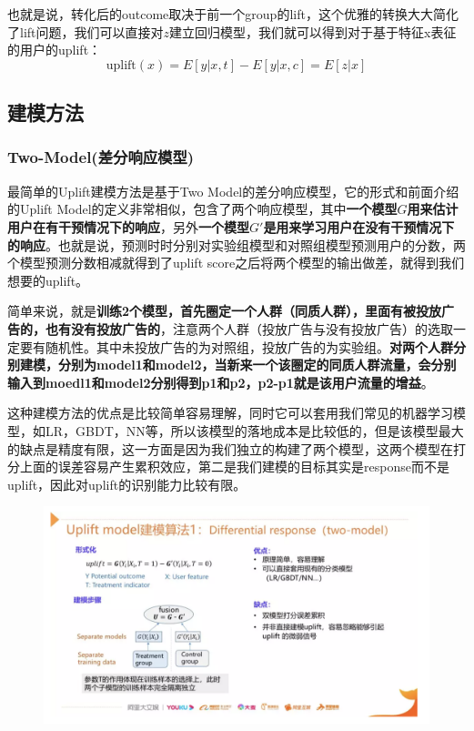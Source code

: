 \documentclass[12pt]{article}
\begin{document}
也就是说，转化后的outcome取决于前一个group的lift，这个优雅的转换大大简化了lift问题，我们可以直接对$z$建立回归模型，我们就可以得到对于基于特征x表征的用户的uplift：
$$
\text{uplift}(x) = E[y|x,t] - E[y|x,c] = E[z|x]
$$


\subsection{建模方法}
\subsubsection{Two-Model(差分响应模型)}
最简单的Uplift建模方法是基于Two Model的差分响应模型，它的形式和前面介绍的Uplift Model的定义非常相似，包含了两个响应模型，其中\textbf{一个模型$G$用来估计用户在有干预情况下的响应}，另外\textbf{一个模型$G'$是用来学习用户在没有干预情况下的响应}。也就是说，预测时时分别对实验组模型和对照组模型预测用户的分数，两个模型预测分数相减就得到了uplift score之后将两个模型的输出做差，就得到我们想要的uplift。

简单来说，就是\textbf{训练2个模型，首先圈定一个人群（同质人群），里面有被投放广告的，也有没有投放广告的}，注意两个人群（投放广告与没有投放广告）的选取一定要有随机性。其中未投放广告的为对照组，投放广告的为实验组。\textbf{对两个人群分别建模，分别为model1和model2，当新来一个该圈定的同质人群流量，会分别输入到moedl1和model2分别得到p1和p2，p2-p1就是该用户流量的增益}\cite{Understand_Uplift_Model_In_Ads}。

这种建模方法的优点是比较简单容易理解，同时它可以套用我们常见的机器学习模型，如LR，GBDT，NN等，所以该模型的落地成本是比较低的，但是该模型最大的缺点是精度有限，这一方面是因为我们独立的构建了两个模型，这两个模型在打分上面的误差容易产生累积效应，第二是我们建模的目标其实是response而不是uplift，因此对uplift的识别能力比较有限。

\begin{figure}[H]
    \centering
    \includegraphics[width=1\textwidth]{fig/CasualInference-Uplift-Model-Two-Model.png}
\end{figure}
\end{document}
